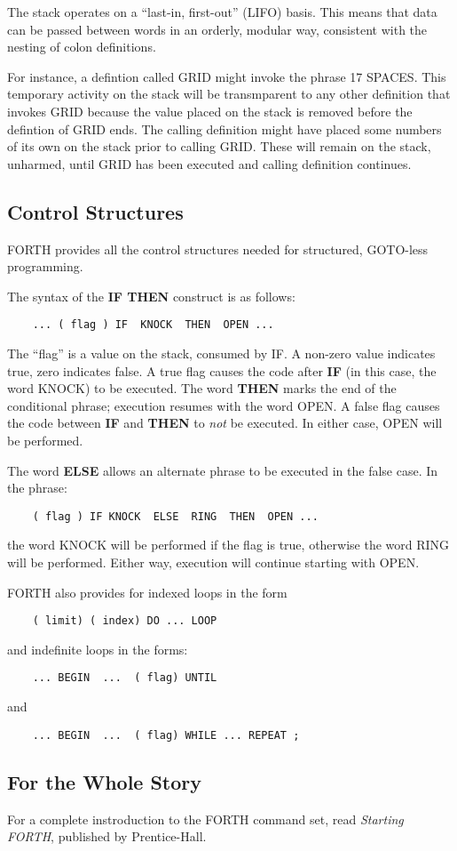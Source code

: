 The stack operates on a ``last-in, first-out'' (LIFO) basis.  This means
that data can be passed between words in an orderly, modular way, consistent
with the nesting of colon definitions.

For instance, a defintion called GRID might invoke the phrase 17 SPACES.  
This temporary activity on the stack will be transmparent to any
other definition that invokes GRID because the value placed on the stack
is removed before the defintion of GRID ends.  The calling definition 
might have placed some numbers of its own on the stack prior to calling 
GRID.  These will remain on the stack, unharmed, until GRID has been 
executed  and calling definition continues.   %
\subsection{Control Structures}
FORTH provides all the control structures
needed for structured, GOTO-less programming.

The syntax of the {\bf IF THEN} construct is as follows:
\begin{verbatim}
    ... ( flag ) IF  KNOCK  THEN  OPEN ...
\end{verbatim}
The ``flag'' is a value on the stack, consumed by IF. A non-zero value
indicates true, zero indicates false.  A true flag causes the code after {\bf IF} (in
this case, the word KNOCK) to be executed.  The word {\bf THEN} marks the
end of the conditional phrase; execution resumes with the word OPEN.  A
false flag causes the code between {\bf IF} and {\bf THEN} to {\em not} be executed.  In
either case, OPEN will be performed.

The word {\bf ELSE} allows an alternate phrase to be executed
in the false case. In the phrase:
\begin{verbatim}
    ( flag ) IF KNOCK  ELSE  RING  THEN  OPEN ...
\end{verbatim}
the word KNOCK will be performed if the flag is true, otherwise the word
RING will be performed.  Either way, execution will continue starting
with OPEN.

FORTH also provides for indexed loops in the form
\begin{verbatim}
    ( limit) ( index) DO ... LOOP
\end{verbatim}
and indefinite loops in the forms:
\begin{verbatim}
    ... BEGIN  ...  ( flag) UNTIL
\end{verbatim}
and
\begin{verbatim}
    ... BEGIN  ...  ( flag) WHILE ... REPEAT ;
\end{verbatim}
\subsection{For the Whole Story}
For a complete instroduction to the FORTH command set, read {\em Starting
FORTH}, published by Prentice-Hall.
